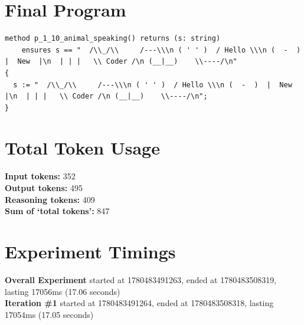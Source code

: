\documentclass{article}
\begin{document}
\section*{Final Program}
\begin{lstlisting}
method p_1_10_animal_speaking() returns (s: string)
	ensures s == "  /\\_/\\     /---\\\n ( ' ' )  / Hello \\\n (  -  )  |  New  |\n  | | |   \\ Coder /\n (__|__)    \\----/\n"
{
  s := "  /\\_/\\     /---\\\n ( ' ' )  / Hello \\\n (  -  )  |  New  |\n  | | |   \\ Coder /\n (__|__)    \\----/\n";
}
\end{lstlisting}
\section*{Total Token Usage}
\textbf{Input tokens: }352
\\\textbf{Output tokens: }495
\\\textbf{Reasoning tokens: }409
\\\textbf{Sum of `total tokens': }847
\section*{Experiment Timings}
\textbf{Overall Experiment} started at 1780483491263, ended at 1780483508319, lasting 17056ms (17.06 seconds)
\\\textbf{Iteration \#1} started at 1780483491264, ended at 1780483508318, lasting 17054ms (17.05 seconds)
\end{document}
